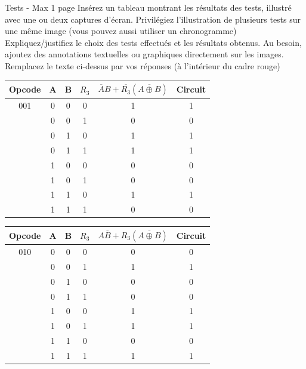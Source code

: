 \documentclass[a4paper]{article}
\begin{document}
\begin{tcolorbox}[colframe=Monokaimagenta,colback=white]
Tests - Max 1 page 
Insérez  un tableau montrant les résultats des tests, illustré avec une ou deux captures d’écran. Privilégiez l’illustration de plusieurs tests sur une même image (vous pouvez aussi utiliser un chronogramme)
Expliquez/justifiez le choix des tests effectués et les résultats obtenus.
Au besoin, ajoutez des annotations textuelles ou graphiques directement sur les images.
Remplacez le texte ci-dessus par vos réponses (à l’intérieur du cadre rouge)
\begin{center}
    

\begin{tabular}{|c|c|c|c|cc|}
\hline
    Opcode & A & B & $R_3$ & $\overline{A}B + \overline{R_3}(\overline{A \oplus B})$ & Circuit\\
   \hline
    001    & 0 & 0 & 0     & 1             & 1 \\
           & 0 & 0 & 1     & 0             & 0\\
           & 0 & 1 & 0     & 1             & 1 \\
           & 0 & 1 & 1     & 1             & 1\\
           & 1 & 0 & 0     & 0             & 0\\
           & 1 & 0 & 1     & 0             & 0 \\
           & 1 & 1 & 0     & 1             & 1 \\
           & 1 & 1 & 1     & 0             & 0 \\
\end{tabular}

\smallskip
    
\begin{tabular}{|c|c|c|c|cc|}
\hline    
Opcode & A & B & $R_3$ & $A\overline{B} + {R_3}(\overline{A \oplus B})$ & Circuit\\
\hline
    010    & 0 & 0 & 0     & 0             & 0 \\
           & 0 & 0 & 1     & 1             & 1\\
           & 0 & 1 & 0     & 0             & 0 \\
           & 0 & 1 & 1     & 0             & 0\\
           & 1 & 0 & 0     & 1             & 1\\
           & 1 & 0 & 1     & 1             & 1 \\
           & 1 & 1 & 0     & 0             & 0 \\
           & 1 & 1 & 1     & 1             & 1 \\
\end{tabular}


\end{center}
\end{tcolorbox}
\end{document}

